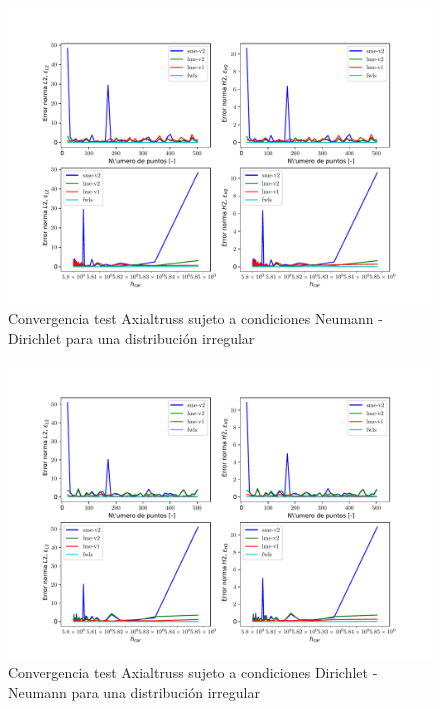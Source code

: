 \begin{figure}
    \centering
    \includegraphics[width=1\textwidth]{./Imagenes/06/comparacion_shp_irreg/Axialtruss_irreg_type-2_caso-2_direct_dgesv-lapack-blas_sme-v2_lme-v2_lme-v1_fwls.pdf}
    \caption{Convergencia test Axialtruss sujeto a condiciones Neumann - Dirichlet para una distribución irregular} \label{fig:Axialtruss_caso-2_conv_irreg}
\end{figure}
\begin{figure}
    \centering
    \includegraphics[width=1\textwidth]{./Imagenes/06/comparacion_shp_irreg/Axialtruss_irreg_type-2_caso-3_direct_dgesv-lapack-blas_sme-v2_lme-v2_lme-v1_fwls.pdf}
    \caption{Convergencia test Axialtruss sujeto a condiciones Dirichlet - Neumann para una distribución irregular} \label{fig:Axialtruss_caso-3_conv_irreg}
\end{figure}

